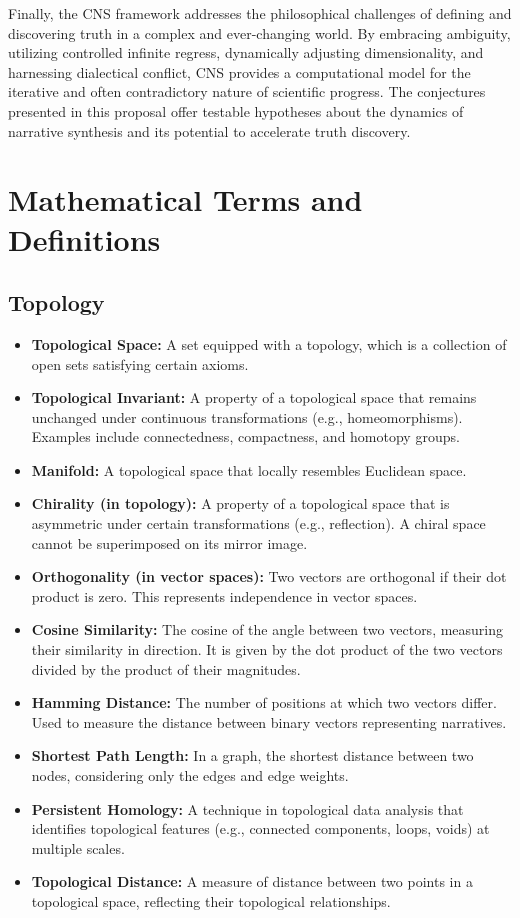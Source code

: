 \documentclass[12pt, a4paper]{article}
\begin{document}
Finally, the CNS framework addresses the philosophical challenges of defining and discovering truth in a complex and ever-changing world.  By embracing ambiguity, utilizing controlled infinite regress, dynamically adjusting dimensionality, and harnessing dialectical conflict, CNS provides a computational model for the iterative and often contradictory nature of scientific progress.  The conjectures presented in this proposal offer testable hypotheses about the dynamics of narrative synthesis and its potential to accelerate truth discovery.
 
 
\section{Mathematical Terms and Definitions}

\subsection{Topology}

\begin{itemize}
    \item \textbf{Topological Space:} A set equipped with a topology, which is a collection of open sets satisfying certain axioms.
    \item \textbf{Topological Invariant:} A property of a topological space that remains unchanged under continuous transformations (e.g., homeomorphisms). Examples include connectedness, compactness, and homotopy groups.
    \item \textbf{Manifold:} A topological space that locally resembles Euclidean space.
    \item \textbf{Chirality (in topology): } A property of a topological space that is asymmetric under certain transformations (e.g., reflection).  A chiral space cannot be superimposed on its mirror image.
    \item \textbf{Orthogonality (in vector spaces): } Two vectors are orthogonal if their dot product is zero. This represents independence in vector spaces.
    \item \textbf{Cosine Similarity:} The cosine of the angle between two vectors, measuring their similarity in direction. It is given by the dot product of the two vectors divided by the product of their magnitudes.
    \item \textbf{Hamming Distance:} The number of positions at which two vectors differ. Used to measure the distance between binary vectors representing narratives.
    \item \textbf{Shortest Path Length:} In a graph, the shortest distance between two nodes, considering only the edges and edge weights.
    \item \textbf{Persistent Homology:} A technique in topological data analysis that identifies topological features (e.g., connected components, loops, voids) at multiple scales.
    \item \textbf{Topological Distance:} A measure of distance between two points in a topological space, reflecting their topological relationships.
\end{itemize}
\end{document}
